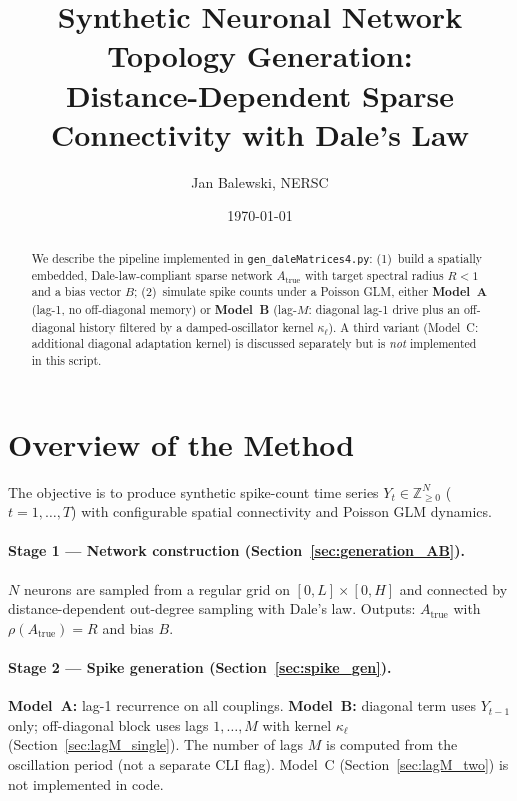 \documentclass[11pt]{article}
\title{Synthetic Neuronal Network Topology Generation:\\
Distance-Dependent Sparse Connectivity with Dale's Law}
\author{Jan Balewski, NERSC}
\date{\today}
\begin{document}
\maketitle

\begin{abstract}
We describe the pipeline implemented in \texttt{gen\_daleMatrices4.py}:
(1)~build a spatially embedded, Dale-law-compliant sparse network
$A_{\text{true}}$ with target spectral radius $R<1$ and a bias vector $B$;
(2)~simulate spike counts under a Poisson GLM, either
\textbf{Model~A} (lag-1, no off-diagonal memory) or
\textbf{Model~B} (lag-$M$: diagonal lag-1 drive plus an off-diagonal
history filtered by a damped-oscillator kernel $\kappa_\ell$).
A third variant (Model~C: additional diagonal adaptation kernel) is
discussed separately but is \emph{not} implemented in this script.
\end{abstract}

\tableofcontents
\newpage

\section{Overview of the Method}
\label{sec:overview}

The objective is to produce synthetic spike-count time series
$Y_t\in\mathbb{Z}_{\geq 0}^{N}$ ($t=1,\dots,T$) with configurable
spatial connectivity and Poisson GLM dynamics.

\paragraph{Stage 1 --- Network construction (Section~\ref{sec:generation_AB}).}
$N$ neurons are sampled from a regular grid on $[0,L]\times[0,H]$ and
connected by distance-dependent out-degree sampling with Dale's law.
Outputs: $A_{\text{true}}$ with $\rho(A_{\text{true}})=R$ and bias $B$.

\paragraph{Stage 2 --- Spike generation (Section~\ref{sec:spike_gen}).}
\textbf{Model~A:} lag-1 recurrence on all couplings.
\textbf{Model~B:} diagonal term uses $Y_{t-1}$ only; off-diagonal
block uses lags $1,\dots,M$ with kernel $\kappa_\ell$
(Section~\ref{sec:lagM_single}). The number of lags $M$ is computed from
the oscillation period (not a separate CLI flag).
Model~C (Section~\ref{sec:lagM_two}) is not implemented in code.
\end{document}
